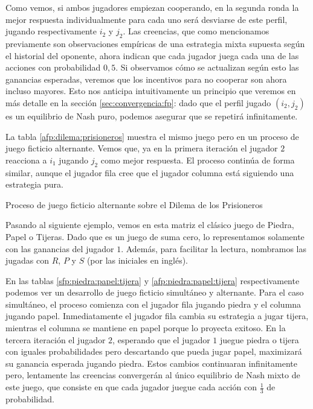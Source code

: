 Como vemos, si ambos jugadores empiezan cooperando, en la segunda ronda la mejor respuesta individualmente para cada uno será desviarse de este perfil, jugando respectivamente $i_2$ y $j_2$. Las creencias, que como mencionamos previamente son observaciones empíricas de una estrategia mixta supuesta según el historial del oponente, ahora indican que cada jugador juega cada una de las acciones con probabilidad $0,5$. Si observamos cómo se actualizan según esto las ganancias esperadas, veremos que los incentivos para no cooperar son ahora incluso mayores. Esto nos anticipa intuitivamente un principio que veremos en más detalle en la sección \ref{sec:convergencia:fp}: dado que el perfil jugado $(i_2, j_2)$ es un equilibrio de Nash puro, podemos asegurar que se repetirá infinitamente.

La tabla \ref{afp:dilema:prisioneros} muestra el mismo juego pero en un proceso de juego ficticio alternante. Vemos que, ya en la primera iteración el jugador $2$ reacciona a $i_1$ jugando $j_2$ como mejor respuesta. El proceso continúa de forma similar, aunque el jugador fila cree que el jugador columna está siguiendo una estrategia pura.

\begin{table} %
    \centering
    
    \caption{Proceso de juego ficticio alternante sobre el Dilema de los Prisioneros}
    \label{afp:dilema:prisioneros}
\end{table}

Pasando al siguiente ejemplo, vemos en esta matriz el clásico juego de Piedra, Papel o Tijeras. Dado que es un juego de suma cero, lo representamos solamente con las ganancias del jugador $1$. Además, para facilitar la lectura, nombramos las jugadas con $R$, $P$ y $S$ (por las iniciales en inglés).



En las tablas \ref{sfp:piedra:papel:tijera} y \ref{afp:piedra:papel:tijera} respectivamente podemos ver un desarrollo de juego ficticio simultáneo y alternante. Para el caso simultáneo, el proceso comienza con el jugador fila jugando piedra y el columna jugando papel. Inmediatamente el jugador fila cambia su estrategia a jugar tijera, mientras el columna se mantiene en papel porque lo proyecta exitoso. En la tercera iteración el jugador $2$, esperando que el jugador $1$ juegue piedra o tijera con iguales probabilidades pero descartando que pueda jugar papel, maximizará su ganancia esperada jugando piedra. Estos cambios continuaran infinitamente pero, lentamente las creencias convergerán al único equilibrio de Nash mixto de este juego, que consiste en que cada jugador juegue cada acción con $\frac{1}{3}$ de probabilidad.

